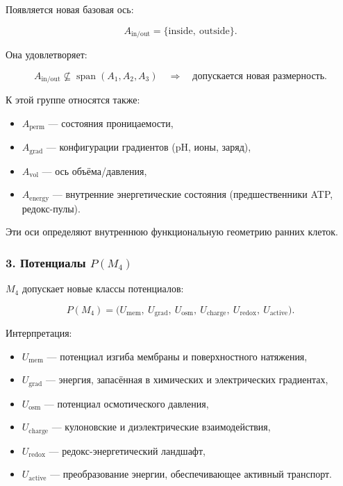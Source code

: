Появляется новая базовая ось:

\[
A_{\mathrm{in/out}} = \{ \text{inside},\ \text{outside} \}.
\]

Она удовлетворяет:

\[
A_{\mathrm{in/out}} \not\subseteq \operatorname{span}(A_1, A_2, A_3)
\quad\Rightarrow\quad
\text{допускается новая размерность}.
\]

К этой группе относятся также:

\begin{itemize}
    \item $A_{\mathrm{perm}}$ — состояния проницаемости,
    \item $A_{\mathrm{grad}}$ — конфигурации градиентов (pH, ионы, заряд),
    \item $A_{\mathrm{vol}}$ — ось объёма/давления,
    \item $A_{\mathrm{energy}}$ — внутренние энергетические состояния
          (предшественники ATP, редокс-пулы).
\end{itemize}

Эти оси определяют внутреннюю функциональную геометрию ранних клеток.

\subsubsection*{3. Потенциалы \texorpdfstring{$P(M_4)$}{P(M_4)}}

$M_4$ допускает новые классы потенциалов:

\[
P(M_4) =
\big(
U_{\mathrm{mem}},\
U_{\mathrm{grad}},\
U_{\mathrm{osm}},\
U_{\mathrm{charge}},\
U_{\mathrm{redox}},\
U_{\mathrm{active}}
\big).
\]

Интерпретация:

\begin{itemize}
    \item $U_{\mathrm{mem}}$ — потенциал изгиба мембраны и поверхностного натяжения,
    \item $U_{\mathrm{grad}}$ — энергия, запасённая в химических и электрических градиентах,
    \item $U_{\mathrm{osm}}$ — потенциал осмотического давления,
    \item $U_{\mathrm{charge}}$ — кулоновские и диэлектрические взаимодействия,
    \item $U_{\mathrm{redox}}$ — редокс-энергетический ландшафт,
    \item $U_{\mathrm{active}}$ — преобразование энергии, обеспечивающее
          активный транспорт.
\end{itemize}

